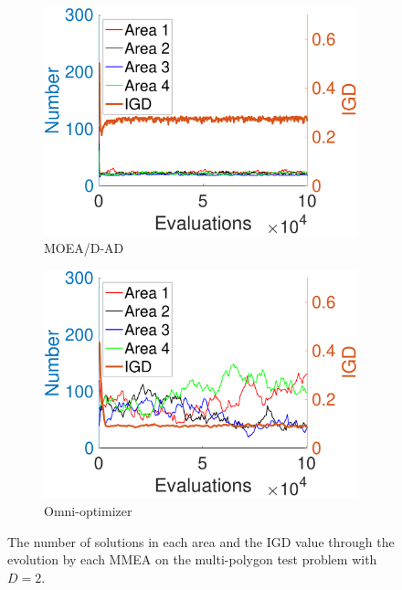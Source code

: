 \documentclass[conference]{IEEEtran}
\begin{document}
\begin{figure}[t!]
    \begin{subfigure}[b]{.24\textwidth}
    \includegraphics[width=\linewidth]{Section5/dim2/Diversity/MOEADAD}
    \caption{MOEA/D-AD}
    \end{subfigure}
    \begin{subfigure}[b]{.24\textwidth}
    \includegraphics[width=\linewidth]{Section5/dim2/Diversity/OmniOptimizer}
    \caption{Omni-optimizer}
    \end{subfigure}
    \caption{The number of solutions in each area and the IGD value through the evolution by each MMEA on the multi-polygon test problem with $D=2$.}
    \label{fig: MMEAs Diversity dim=2}
\end{figure}
\end{document}
